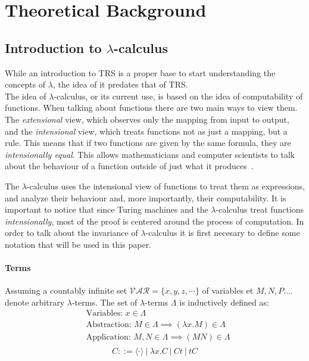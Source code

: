 \documentclass[12pt]{article}
\begin{document}
\section{Theoretical Background}\label{theoretical-background}
  \subsection{Introduction to $\lambda$-calculus}\label{intro-lambda}
  While an introduction to TRS is a proper base to start understanding the concepts of $\lambda$, the idea of it predates that of TRS. \\
The idea of $\lambda$-calculus, or its current use, is based on the idea of computability of functions. When talking about functions there are two main ways to view them. The \textit{extensional} view, which observes only the mapping from input to output, and the \textit{intensional} view, which treats functions not as just a mapping, but a rule. This means that if two functions are given by the same formula, they are \textit{intensionally equal}. This allows mathematicians and computer scientists to talk about the behaviour of a function outside of just what it produces~\cite{selinger}.

The $\lambda$-calculus uses the intensional view of functions to treat them as expressions, and analyze their behaviour and, more importantly, their computability. It is important to notice that since Turing machines and the $\lambda$-calculus treat functions \textit{intensionally}, most of the proof is centered around the process of computation.
In order to talk about the invariance of $\lambda$-calculus it is first necesary to define some notation that will be used in this paper.
\paragraph{Terms} Assuming a countably infinite set $\mathcal{VAR} = \{ x, y, z, \cdots \}$ of variables et $M, N, P....$ denote arbitrary $\lambda$-terms. The set of $\lambda$-terms $\Lambda$ is inductively defined as:
\begin{equation*}
  \begin{split}
  & \text{Variables: } x \in \Lambda \\
  & \text{Abstraction: } M \in \Lambda \implies ( \lambda x.M ) \in \Lambda \\
  & \text{Application: } M, N \in \Lambda \implies (M N) \in \Lambda \\
  \end{split}
\end{equation*}
\begin{equation*}
C ::= \langle \cdot \rangle \ | \ \lambda x.C \ | \ Ct \ | \ tC
\end{equation*}
\end{document}
